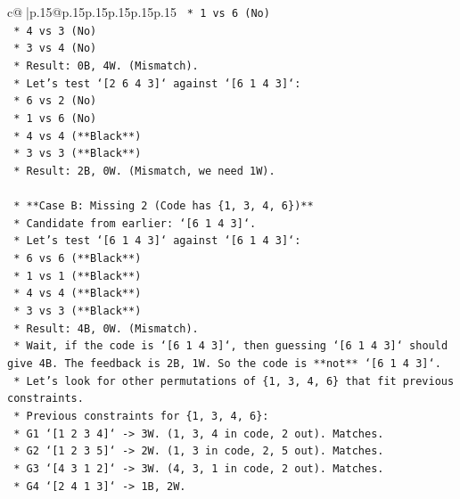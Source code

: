 \documentclass{article}
\begin{document}
{\begin{supertabular}{c@{$\;$}|p{.15\linewidth}@{}p{.15\linewidth}p{.15\linewidth}p{.15\linewidth}p{.15\linewidth}p{.15\linewidth}}
{{{\texttt{            *   1 vs 6 (No)} \\
\texttt{            *   4 vs 3 (No)} \\
\texttt{            *   3 vs 4 (No)} \\
\texttt{            *   Result: 0B, 4W. (Mismatch).} \\
\texttt{        *   Let's test `{[}2 6 4 3{]}` against `{[}6 1 4 3{]}`:} \\
\texttt{            *   6 vs 2 (No)} \\
\texttt{            *   1 vs 6 (No)} \\
\texttt{            *   4 vs 4 (**Black**)} \\
\texttt{            *   3 vs 3 (**Black**)} \\
\texttt{            *   Result: 2B, 0W. (Mismatch, we need 1W).} \\
\\ 
\texttt{    *   **Case B: Missing 2 (Code has \{1, 3, 4, 6\})**} \\
\texttt{        *   Candidate from earlier: `{[}6 1 4 3{]}`.} \\
\texttt{        *   Let's test `{[}6 1 4 3{]}` against `{[}6 1 4 3{]}`:} \\
\texttt{            *   6 vs 6 (**Black**)} \\
\texttt{            *   1 vs 1 (**Black**)} \\
\texttt{            *   4 vs 4 (**Black**)} \\
\texttt{            *   3 vs 3 (**Black**)} \\
\texttt{            *   Result: 4B, 0W. (Mismatch).} \\
\texttt{        *   Wait, if the code is `{[}6 1 4 3{]}`, then guessing `{[}6 1 4 3{]}` should give 4B. The feedback is 2B, 1W. So the code is **not** `{[}6 1 4 3{]}`.} \\
\texttt{        *   Let's look for other permutations of \{1, 3, 4, 6\} that fit previous constraints.} \\
\texttt{        *   Previous constraints for \{1, 3, 4, 6\}:} \\
\texttt{            *   G1 `{[}1 2 3 4{]}` {-}> 3W. (1, 3, 4 in code, 2 out). Matches.} \\
\texttt{            *   G2 `{[}1 2 3 5{]}` {-}> 2W. (1, 3 in code, 2, 5 out). Matches.} \\
\texttt{            *   G3 `{[}4 3 1 2{]}` {-}> 3W. (4, 3, 1 in code, 2 out). Matches.} \\
\texttt{            *   G4 `{[}2 4 1 3{]}` {-}> 1B, 2W.} \\
}}}
\end{supertabular}}
\end{document}
